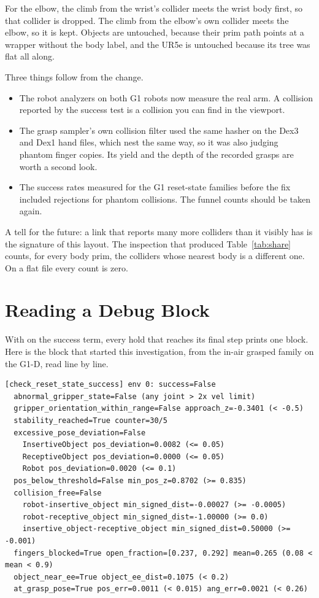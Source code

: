 For the elbow, the climb from the wrist's collider meets the wrist body first, so that collider is dropped. The climb from the elbow's own collider meets the elbow, so it is kept. Objects are untouched, because their prim path points at a wrapper without the body label, and the UR5e is untouched because its tree was flat all along.

Three things follow from the change.
\begin{itemize}[leftmargin=1.4em]
  \item The robot analyzers on both G1 robots now measure the real arm. A collision reported by the success test is a collision you can find in the viewport.
  \item The grasp sampler's own collision filter used the same hasher on the Dex3 and Dex1 hand files, which nest the same way, so it was also judging phantom finger copies. Its yield and the depth of the recorded grasps are worth a second look.
  \item The success rates measured for the G1 reset-state families before the fix included rejections for phantom collisions. The funnel counts should be taken again.
\end{itemize}

A tell for the future: a link that reports many more colliders than it visibly has is the signature of this layout. The inspection that produced Table~\ref{tab:share} counts, for every body prim, the colliders whose nearest body is a different one. On a flat file every count is zero.

\section{Reading a Debug Block}
\label{sec:debug}

With  on the success term, every hold that reaches its final step prints one block. Here is the block that started this investigation, from the in-air grasped family on the G1-D, read line by line.

\begin{lstlisting}[language={}, numbers=none, xleftmargin=4pt, basicstyle=\ttfamily\scriptsize]
[check_reset_state_success] env 0: success=False
  abnormal_gripper_state=False (any joint > 2x vel limit)
  gripper_orientation_within_range=False approach_z=-0.3401 (< -0.5)
  stability_reached=True counter=30/5
  excessive_pose_deviation=False
    InsertiveObject pos_deviation=0.0082 (<= 0.05)
    ReceptiveObject pos_deviation=0.0000 (<= 0.05)
    Robot pos_deviation=0.0020 (<= 0.1)
  pos_below_threshold=False min_pos_z=0.8702 (>= 0.835)
  collision_free=False
    robot-insertive_object min_signed_dist=-0.00027 (>= -0.0005)
    robot-receptive_object min_signed_dist=-1.00000 (>= 0.0)
    insertive_object-receptive_object min_signed_dist=0.50000 (>= -0.001)
  fingers_blocked=True open_fraction=[0.237, 0.292] mean=0.265 (0.08 < mean < 0.9)
  object_near_ee=True object_ee_dist=0.1075 (< 0.2)
  at_grasp_pose=True pos_err=0.0011 (< 0.015) ang_err=0.0021 (< 0.26)
\end{lstlisting}

